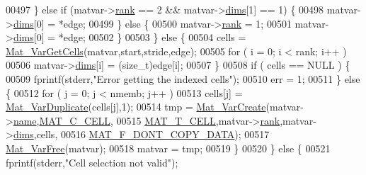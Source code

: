 \begin{DoxyCode}
{{{{{{{{{{{00497                     \} \textcolor{keywordflow}{else} \textcolor{keywordflow}{if} (matvar->\hyperlink{group___m_a_t_a84ba70c96ded13cc555fa75b768d9921}{rank} == 2 && matvar->\hyperlink{group___m_a_t_a8e01234e1c862ce3472bb37f5a09b92c}{dims}[1] == 1) \{
00498                         matvar->\hyperlink{group___m_a_t_a8e01234e1c862ce3472bb37f5a09b92c}{dims}[0] = *edge;
00499                     \} \textcolor{keywordflow}{else} \{
00500                         matvar->\hyperlink{group___m_a_t_a84ba70c96ded13cc555fa75b768d9921}{rank} = 1;
00501                         matvar->\hyperlink{group___m_a_t_a8e01234e1c862ce3472bb37f5a09b92c}{dims}[0] = *edge;
00502                     \}
00503                 \} \textcolor{keywordflow}{else} \{
00504                     cells = \hyperlink{group___m_a_t_ga0732b0a6c40975b036068b9a14422d45}{Mat\_VarGetCells}(matvar,start,stride,edge);
00505                     \textcolor{keywordflow}{for} ( i = 0; i < rank; i++ )
00506                         matvar->\hyperlink{group___m_a_t_a8e01234e1c862ce3472bb37f5a09b92c}{dims}[i] = (\textcolor{keywordtype}{size\_t})edge[i];
00507                 \}
00508                 \textcolor{keywordflow}{if} ( cells == NULL ) \{
00509                     fprintf(stderr,\textcolor{stringliteral}{"Error getting the indexed cells"});
00510                     err = 1;
00511                 \} \textcolor{keywordflow}{else} \{
00512                     \textcolor{keywordflow}{for} ( j = 0; j < nmemb; j++ )
00513                         cells[j] = \hyperlink{group___m_a_t_ga7ef80c5d99d7918b2b09db3bea106ecc}{Mat\_VarDuplicate}(cells[j],1);
00514                     tmp = \hyperlink{group___m_a_t_ga1c54a84bb4d810c6fccdb8869489eac4}{Mat\_VarCreate}(matvar->\hyperlink{group___m_a_t_a5d4b55b041e3b4fb50c04337f05ad909}{name},\hyperlink{group___m_a_t_ggad4d60ae7b709fc81bfd744fb4c857c40a2f7abb47a1c51e248bd4e5e03cc81b08}{MAT\_C\_CELL},
00515                         \hyperlink{group___m_a_t_ggacf7b3b879282b7ab3a51190e49bf3453a07599cf2cca6d2b2d059378563318ba5}{MAT\_T\_CELL},matvar->\hyperlink{group___m_a_t_a84ba70c96ded13cc555fa75b768d9921}{rank},matvar->\hyperlink{group___m_a_t_a8e01234e1c862ce3472bb37f5a09b92c}{dims},cells,
00516                         \hyperlink{group___m_a_t_ggab9d6ef9e3ddca78a317b173f01d53fbba762244499f52eb35e7b53fb79a1f2889}{MAT\_F\_DONT\_COPY\_DATA});
00517                     \hyperlink{group___m_a_t_ga1d14716f7450530fd1c9d02413787f0e}{Mat\_VarFree}(matvar);
00518                     matvar = tmp;
00519                 \}
00520             \} \textcolor{keywordflow}{else} \{
00521                 fprintf(stderr,\textcolor{stringliteral}{"Cell selection not valid"});
}}}}}}}}}}}
\end{DoxyCode}
